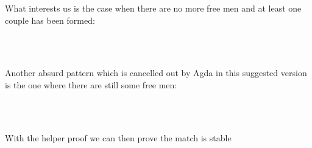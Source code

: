 {What interests us is the case when there are no more free men and at least one couple has been formed:

\begin{code}%
\>[0]%
\>[3353I]\AgdaSymbol{(}%
\>[3354I]\AgdaSpace{}%
\AgdaInductiveConstructor{[]}\AgdaSpace{}%
\AgdaSpace{}%
\AgdaSpace{}%
\AgdaSymbol{(}\AgdaSpace{}%
\AgdaSpace{}%
\AgdaSymbol{)}\<%
\\
\>[.][@{}l@{}]\<[3354I]%
\>[32]\AgdaSpace{}%
\AgdaSymbol{)}\<%
\\
\>[.][@{}l@{}]\<[3353I]%
\>[23]\AgdaSpace{}%
\AgdaSymbol{(}\AgdaSpace{}%
\AgdaOperator{\AgdaInductiveConstructor{,}}\AgdaSpace{}%
\AgdaSymbol{)}\AgdaSpace{}%
\AgdaSymbol{(}\AgdaSpace{}%
\AgdaOperator{\AgdaInductiveConstructor{,}}\AgdaSpace{}%
\AgdaSymbol{)}\AgdaSpace{}%
\AgdaSpace{}%
\AgdaSpace{}%
\AgdaSpace{}%
\AgdaSymbol{=}\AgdaSpace{}%
\AgdaSymbol{\{!!\}}\AgdaSpace{}%
\AgdaOperator{\AgdaInductiveConstructor{,}}\AgdaSpace{}%
\AgdaSymbol{\{!!\}}\<%
\end{code}

Another absurd pattern which is cancelled out by Agda in this suggested version is the one where there are still some free men:

\begin{code}%
\>[0]%
\>[3375I]\AgdaSymbol{(}\AgdaSpace{}%
\AgdaSymbol{\AgdaUnderscore{}}\AgdaSpace{}%
\AgdaSymbol{(}\AgdaSpace{}%
\AgdaSpace{}%
\AgdaSymbol{)}\AgdaSpace{}%
\AgdaSymbol{\AgdaUnderscore{}}\AgdaSpace{}%
\AgdaSymbol{\AgdaUnderscore{}}\AgdaSpace{}%
\AgdaSymbol{\AgdaUnderscore{}}\AgdaSpace{}%
\AgdaSymbol{\AgdaUnderscore{}}\AgdaSpace{}%
\AgdaSymbol{\AgdaUnderscore{})}\<%
\\
\>[.][@{}l@{}]\<[3375I]%
\>[23]\AgdaSymbol{()}\AgdaSpace{}%
\AgdaSpace{}%
\AgdaSpace{}%
\AgdaSpace{}%
\AgdaSpace{}%
\<%
\\
\>[0]\<%
\end{code}

With the helper proof we can then prove the match is stable 

}
